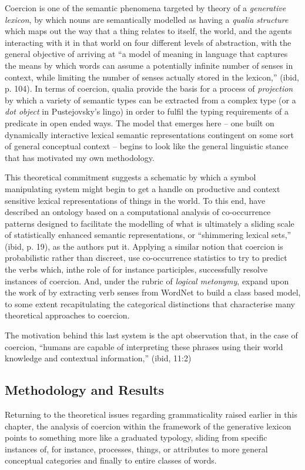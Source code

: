 Coercion is one of the semantic phenomena targeted by  theory of a \emph{generative lexicon}, by which nouns are semantically modelled as having a \emph{qualia structure} which maps out the way that a thing relates to itself, the world, and the agents interacting with it in that world on four different levels of abstraction, with the general objective of arriving at ``a model of meaning in language that captures the means by which words can assume a potentially infinite number of senses in context, while limiting the number of senses actually stored in the lexicon,'' (ibid, p. 104).  In terms of coercion, qualia provide the basis for a process of \emph{projection} by which a variety of semantic types can be extracted from a complex type (or a \emph{dot object} in Pustejovsky's lingo) in order to fulfil the typing requirements of a predicate in open ended ways.  The model that emerges here -- one built on dynamically interactive lexical semantic representations contingent on some sort of general conceptual context -- begins to look like the general linguistic stance that has motivated my own methodology.

This theoretical commitment suggests a schematic by which a symbol manipulating system might begin to get a handle on productive and context sensitive lexical representations of things in the world.  To this end, \cite{JezekEA2010} have described an ontology based on a computational analysis of co-occurrence patterns designed to facilitate the modelling of what is ultimately a sliding scale of statistically enhanced semantic representations, or ``shimmering lexical sets,'' (ibid, p. 19), as the authors put it.  Applying a similar notion that coercion is probabilistic rather than discreet, \cite{LapataEA2003} use co-occurrence statistics to try to predict the verbs which, inthe role of for instance participles, successfully resolve instances of coercion.  And, under the rubric of \emph{logical metonymy}, \cite{ShutovaEA2013b} expand upon the work of \citeauthor{LapataEA2003} by extracting verb senses from WordNet to build a class based model, to some extent recapitulating the categorical distinctions that characterise many theoretical approaches to coercion.

The motivation behind this last system is the apt observation that, in the case of coercion, ``humans are capable of interpreting these phrases using their world knowledge and contextual information,'' (ibid, 11:2)

\subsection{Methodology and Results}
Returning to the theoretical issues regarding grammaticality raised earlier in this chapter, the analysis of coercion within the framework of the generative lexicon points to something more like a graduated typology, sliding from specific instances of, for instance, processes, things, or attributes to more general conceptual categories and finally to entire classes of words.

